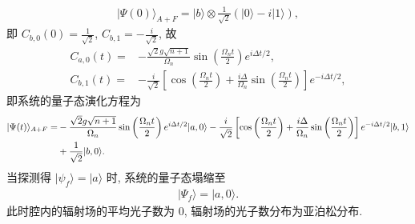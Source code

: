 \documentclass{assignment}
\begin{document}
\begin{sol}
\begin{itemize}
        \begin{align}
            \lvert\Psi(0)\rangle_{A+F}=\lvert b\rangle\otimes\frac{1}{\sqrt{2}}(\lvert 0\rangle-i\lvert 1\rangle),
        \end{align}
        即 $C_{b,0}(0)=\frac{1}{\sqrt{2}}$, $C_{b,1}=-\frac{i}{\sqrt{2}}$,
        故
        \begin{align}
            C_{a,0}(t)=&-\frac{\sqrt{2}g\sqrt{n+1}}{\Omega_n}\sin\left(\frac{\Omega_nt}{2}\right)e^{i\Delta t/2},\\
            C_{b,1}(t)=&-\frac{i}{\sqrt{2}}\left[\cos\left(\frac{\Omega_nt}{2}\right)+\frac{i\Delta}{\Omega_n}\sin\left(\frac{\Omega_nt}{2}\right)\right]e^{-i\Delta t/2},
        \end{align}
        即系统的量子态演化方程为
        \begin{align}
            \notag\lvert\Psi(t)\rangle_{A+F}=&-\frac{\sqrt{2}g\sqrt{n+1}}{\Omega_n}\sin\left(\frac{\Omega_nt}{2}\right)e^{i\Delta t/2}\lvert a,0\rangle-\frac{i}{\sqrt{2}}\left[\cos\left(\frac{\Omega_nt}{2}\right)+\frac{i\Delta}{\Omega_n}\sin\left(\frac{\Omega_nt}{2}\right)\right]e^{-i\Delta t/2}\lvert b,1\rangle\\
            &+\frac{1}{\sqrt{2}}\lvert b,0\rangle.
        \end{align}
        当探测得 $\lvert\psi_f\rangle=\lvert a\rangle$ 时, 系统的量子态塌缩至
        \begin{align}
            \lvert\Psi_f\rangle=\lvert a,0\rangle.
        \end{align}
        此时腔内的辐射场的平均光子数为 $0$, 辐射场的光子数分布为亚泊松分布.
    \end{itemize}
\end{sol}
\end{document}

